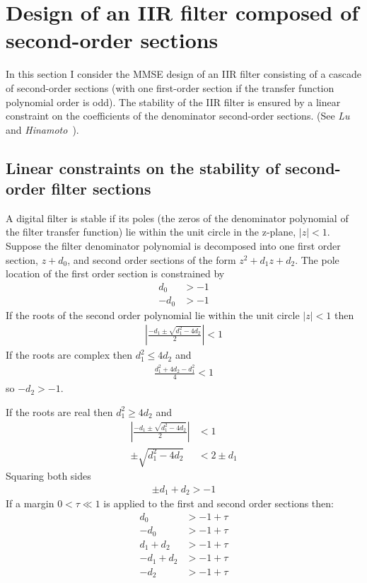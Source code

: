 \documentclass[a4paper,twoside,10pt,english]{report}
\begin{document}
\section{Design of an IIR filter composed of second-order sections}
In this section I consider the MMSE design of an IIR filter consisting of a 
cascade of second-order sections (with one first-order section if the transfer
function polynomial order is odd). The stability of the IIR filter is ensured 
by a linear constraint on the coefficients of the denominator second-order
sections. (See \emph{Lu} and 
\emph{Hinamoto}~\cite{LuHinamoto_IIRRobustStabilityQuadraticProgramming}).
\subsection{\label{sec:Stability-of-second-order-filter-sections}Linear constraints on the stability of second-order filter sections}
A digital filter is stable if its poles (the zeros of the denominator polynomial 
of the filter transfer function) lie within the unit circle in the z-plane,
$\left|z\right|<1$. Suppose the filter denominator polynomial is 
decomposed into one first order section, $z+d_{0}$, and second order sections of
the form $z^{2}+d_{1}z+d_{2}$. The pole location of the first order section 
is constrained by
\begin{align*}
 d_{0} &> -1\\
-d_{0} &> -1
\end{align*}
If the roots of the second order polynomial lie within the unit circle 
$\left|z\right|<1$ then
\begin{align*}
\left|\frac{-d_{1} \pm \sqrt{d_{1}^{2}-4d_{2}}}{2}\right|< 1
\end{align*}
If the roots are complex then $d_{1}^{2} \le 4d_{2}$ and
\begin{align*}
\frac{d_{1}^{2} +4d_{2}-d_{1}^{2}}{4}<1
\end{align*}
so $-d_{2}>-1$. 

If the roots are real then $d_{1}^{2} \ge 4d_{2}$ and
\begin{align*}
\left|\frac{-d_{1} \pm \sqrt{d_{1}^{2}-4d_{2}}}{2} \right| &<1 \\
\pm \sqrt{d_{1}^{2}-4d_{2}} &< 2 \pm d_{1}
\end{align*}
Squaring both sides
\begin{align*}
\pm d_{1} + d_{2} > -1
\end{align*}
If a margin $0<\tau\ll 1$ is applied to the first and second order sections then:
\begin{align*}
d_{0}&>-1+\tau\\
-d_{0}&>-1+\tau\\
d_{1} + d_{2} &> -1+\tau \\
-d_{1} + d_{2} &> -1+\tau \\
-d_{2} &>-1+\tau
\end{align*}
\end{document}
